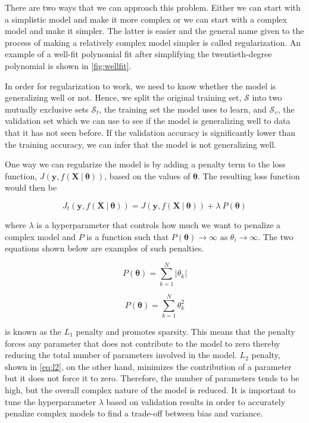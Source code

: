 \newpage

There are two ways that we can approach this problem. Either we can start with a simplistic model and make it more complex or we can start with a complex model and make it simpler. The latter is easier and the general name given to the process of making a relatively complex model simpler is called regularization. An example of a well-fit polynomial fit after simplifying the twentieth-degree polynomial is shown in \cref{fig:wellfit}.

In order for regularization to work, we need to know whether the model is generalizing well or not. Hence, we split the original training set, $\mathcal{S}$ into two mutually exclusive sets $\mathcal{S}_t$, the training set the model uses to learn, and $\mathcal{S}_v$, the validation set which we can use to see if the model is generalizing well to data that it has not seen before. If the validation accuracy is significantly lower than the training accuracy, we can infer that the model is not generalizing well.

One way we can regularize the model is by adding a penalty term to the loss function, $J(\mathbf{y}, f(\mathbf{X} \ | \ \boldsymbol{\theta}))$, based on the values of $\boldsymbol{\theta}$. The resulting loss function would then be

\begin{equation}
	J_{t}(\mathbf{y}, f(\mathbf{X} \ | \ \boldsymbol{\theta})) = J(\mathbf{y}, f(\mathbf{X} \ | \ \boldsymbol{\theta})) + \lambda \ P(\boldsymbol{\theta})
\end{equation}

\noindent
where $\lambda$ is a hyperparameter that controls how much we want to penalize a complex model and $P$ is a function such that $P(\boldsymbol{\theta}) \rightarrow \infty \text{ as } \theta_i \rightarrow \infty$. The two equations shown below are examples of such penalties. 


\begin{equation}
	\label{eq:l1}
	P(\boldsymbol{\boldsymbol{\theta}}) = \sum_{k = 1}^{N}{|\theta_k|}
\end{equation}

\begin{equation}
	\label{eq:l2}
	P(\boldsymbol{\theta}) = \sum_{k = 1}^{N}{\theta_k^2}
\end{equation}


 is known as the $L_1$ penalty and promotes sparsity. This means that the penalty forces any parameter that does not contribute to the model to zero thereby reducing the total number of parameters involved in the model. $L_2$ penalty, shown in \cref{eq:l2}, on the other hand, minimizes the contribution of a parameter but it does not force it to zero. Therefore, the number of parameters tends to be high, but the overall complex nature of the model is reduced. It is important to tune the hyperparameter $\lambda$ based on validation results in order to accurately penalize complex models to find a trade-off between bias and variance. 


